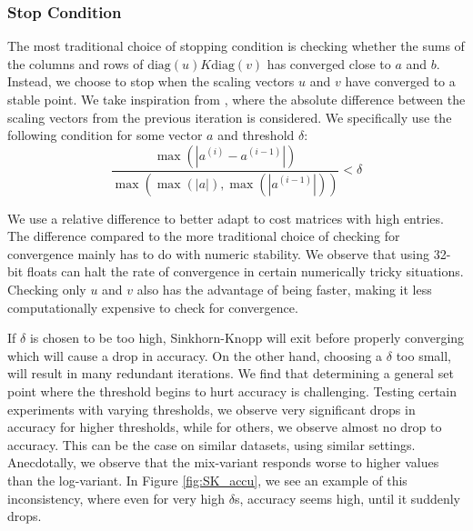 \subsubsection{Stop Condition}
The most traditional choice of stopping condition is checking whether the sums of the columns and rows of $\text{diag}(u)K\text{diag}(v)$ has converged close to $a$ and $b$. Instead, we choose to stop when the scaling vectors $u$ and $v$ have converged to a stable point. We take inspiration from \cite{li2023importance}, where the absolute difference between the scaling vectors from the previous iteration is considered. We specifically use the following condition for some vector $a$ and threshold $\delta$:
\begin{equation}
    \frac{\max(|a^{(i)} - a^{(i - 1)}|)}{\max(\max(|a|), \max(|a^{(i - 1)}|))} < \delta
\end{equation}

We use a relative difference to better adapt to cost matrices with high entries. The difference compared to the more traditional choice of checking for convergence mainly has to do with numeric stability. We observe that using 32-bit floats can halt the rate of convergence in certain numerically tricky situations. Checking only $u$ and $v$ also has the advantage of being faster, making it less computationally expensive to check for convergence.

If $\delta$ is chosen to be too high, Sinkhorn-Knopp will exit before properly converging which will cause a drop in accuracy. On the other hand, choosing a $\delta$ too small, will result in many redundant iterations. We find that determining a general set point where the threshold begins to hurt accuracy is challenging. Testing certain experiments with varying thresholds, we observe very significant drops in accuracy for higher thresholds, while for others, we observe almost no drop to accuracy. This can be the case on similar datasets, using similar settings. Anecdotally, we observe that the mix-variant responds worse to higher values than the log-variant. In Figure \ref{fig:SK_accu}, we see an example of this inconsistency, where even for very high $\delta$s, accuracy seems high, until it suddenly drops. 

